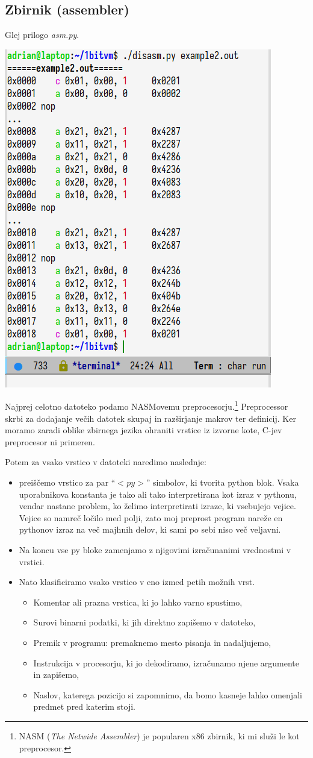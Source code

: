 \documentclass[12pt]{article}
\begin{document}
\subsection{Zbirnik (assembler)}
Glej prilogo \textit{asm.py}.

\begin{center}
  \includegraphics[width=.3\linewidth]{slike/razbirnik.png}
\end{center}

Najprej celotno datoteko podamo NASMovemu preprocesorju.\footnote{NASM (\textit{The Netwide Assembler}) je popularen x86 zbirnik, ki mi služi le kot preprocesor.}
Preprocessor skrbi za dodajanje večih datotek skupaj in razširjanje makrov ter definicij.
Ker moramo zaradi oblike zbirnega jezika ohraniti vrstice iz izvorne kote, C-jev preprocesor ni primeren.

Potem za vsako vrstico v datoteki naredimo naslednje:
\begin{itemize}
  \item preiščemo vrstico za par ``$<py>$'' simbolov, ki tvorita python blok.
  Vsaka uporabnikova konstanta je tako ali tako interpretirana kot izraz v pythonu, vendar nastane problem, ko želimo interpretirati izraze, ki vsebujejo vejice.
  Vejice so namreč ločilo med polji, zato moj preprost program nareže en pythonov izraz na več majhnih delov, ki sami po sebi niso več veljavni.
  \item Na koncu vse py bloke zamenjamo z njigovimi izračunanimi vrednostmi v vrstici.
  \item Nato klasificiramo vsako vrstico v eno izmed petih možnih vrst.
  \begin{itemize}
    \item Komentar ali prazna vrstica, ki jo lahko varno spustimo,
    \item Surovi binarni podatki, ki jih direktno zapišemo v datoteko,
    \item Premik v programu: premaknemo mesto pisanja in nadaljujemo,
    \item Instrukcija v procesorju, ki jo dekodiramo, izračunamo njene argumente in zapišemo,
    \item Naslov, katerega pozicijo si zapomnimo, da bomo kasneje lahko omenjali predmet pred katerim stoji.
  \end{itemize}
\end{itemize}
\end{document}
